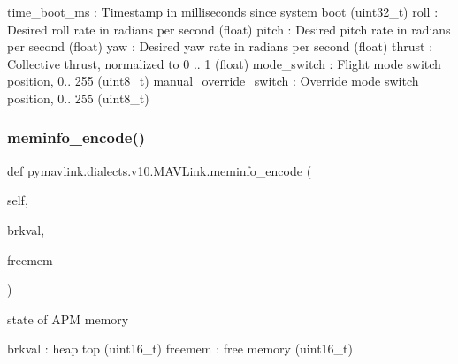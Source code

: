 \begin{DoxyVerb}
\begin{DoxyVerb}
\begin{DoxyVerb}
\begin{DoxyVerb}
\begin{DoxyVerb}
time_boot_ms              : Timestamp in milliseconds since system boot (uint32_t)
roll                      : Desired roll rate in radians per second (float)
pitch                     : Desired pitch rate in radians per second (float)
yaw                       : Desired yaw rate in radians per second (float)
thrust                    : Collective thrust, normalized to 0 .. 1 (float)
mode_switch               : Flight mode switch position, 0.. 255 (uint8_t)
manual_override_switch        : Override mode switch position, 0.. 255 (uint8_t)\end{DoxyVerb}
 \mbox{\label{classpymavlink_1_1dialects_1_1v10_1_1MAVLink_a74f5524f5864db80a209b6c30eb43f05}} 
\subsubsection{\texorpdfstring{meminfo\+\_\+encode()}{meminfo\_encode()}}
{\footnotesize\ttfamily def pymavlink.\+dialects.\+v10.\+M\+A\+V\+Link.\+meminfo\+\_\+encode (\begin{DoxyParamCaption}\item[{}]{self,  }\item[{}]{brkval,  }\item[{}]{freemem }\end{DoxyParamCaption})}

\begin{DoxyVerb}state of APM memory

brkval                    : heap top (uint16_t)
freemem                   : free memory (uint16_t)\end{DoxyVerb}
 \mbox{\label{classpymavlink_1_1dialects_1_1v10_1_1MAVLink_a584f373180570115312d3e2bcc21f5f3}} 

\end{DoxyVerb}
\end{DoxyVerb}
\end{DoxyVerb}
\end{DoxyVerb}
